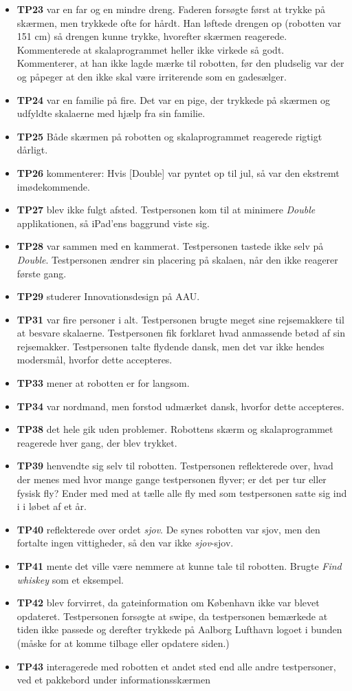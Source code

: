 \begin{itemize}
\item \textbf{TP23} var en far og en mindre dreng. Faderen forsøgte først at trykke på skærmen, men trykkede ofte for hårdt. Han løftede drengen op (robotten var 151 cm) så drengen kunne trykke, hvorefter skærmen reagerede. Kommenterede at skalaprogrammet heller ikke virkede så godt. Kommenterer, at han ikke lagde mærke til robotten, før den pludselig var der og påpeger at den ikke skal være irriterende som en gadesælger.
\item \textbf{TP24} var en familie på fire. Det var en pige, der trykkede på skærmen og udfyldte skalaerne med hjælp fra sin familie.
\item \textbf{TP25} Både skærmen på robotten og skalaprogrammet reagerede rigtigt dårligt.
\item \textbf{TP26} kommenterer: Hvis [Double] var pyntet op til jul, så var den ekstremt imødekommende.
\item \textbf{TP27} blev ikke fulgt afsted. Testpersonen kom til at minimere \textit{Double} applikationen, så iPad'ens baggrund viste sig.
\item \textbf{TP28} var sammen med en kammerat. Testpersonen tastede ikke selv på \textit{Double}. Testpersonen ændrer sin placering på skalaen, når den ikke reagerer første gang.
\item \textbf{TP29} studerer Innovationsdesign på AAU.
\item \textbf{TP31} var fire personer i alt. Testpersonen brugte meget sine rejsemakkere til at besvare skalaerne. Testpersonen fik forklaret hvad anmassende betød af sin rejsemakker. Testpersonen talte flydende dansk, men det var ikke hendes modersmål, hvorfor dette accepteres.
\item \textbf{TP33} mener at robotten er for langsom.
\item \textbf{TP34} var nordmand, men forstod udmærket dansk, hvorfor dette accepteres.
\item \textbf{TP38} det hele gik uden problemer. Robottens skærm og skalaprogrammet reagerede hver gang, der blev trykket.
\item \textbf{TP39} henvendte sig selv til robotten. Testpersonen reflekterede over, hvad der menes med hvor mange gange testpersonen flyver; er det per tur eller fysisk fly? Ender med med at tælle alle fly med som testpersonen satte sig ind i i løbet af et år.
\item \textbf{TP40} reflekterede over ordet \textit{sjov}. De synes robotten var sjov, men den fortalte ingen vittigheder, så den var ikke \textit{sjov}-sjov.
\item \textbf{TP41} mente det ville være nemmere at kunne tale til robotten. Brugte \textit{Find whiskey} som et eksempel.
\item \textbf{TP42} blev forvirret, da gateinformation om København ikke var blevet opdateret. Testpersonen forsøgte at swipe, da testpersonen bemærkede at tiden ikke passede og derefter trykkede på Aalborg Lufthavn logoet i bunden (måske for at komme tilbage eller opdatere siden.)
\item \textbf{TP43} interagerede med robotten et andet sted end alle andre testpersoner, ved et pakkebord under informationsskærmen
\end{itemize}
